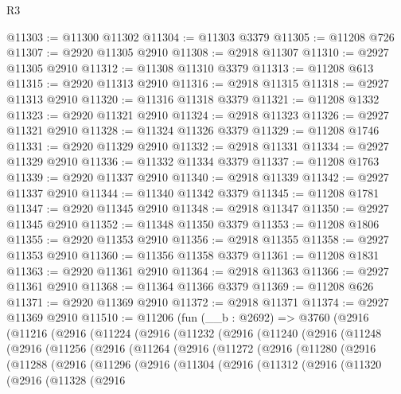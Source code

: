\begin{lexlean}{R3}
\begin{coremodule}
@11303 := @11300 @11302
@11304 := @11303 @3379
@11305 := @11208 @726
@11307 := @2920 @11305 @2910
@11308 := @2918 @11307
@11310 := @2927 @11305 @2910
@11312 := @11308 @11310 @3379
@11313 := @11208 @613
@11315 := @2920 @11313 @2910
@11316 := @2918 @11315
@11318 := @2927 @11313 @2910
@11320 := @11316 @11318 @3379
@11321 := @11208 @1332
@11323 := @2920 @11321 @2910
@11324 := @2918 @11323
@11326 := @2927 @11321 @2910
@11328 := @11324 @11326 @3379
@11329 := @11208 @1746
@11331 := @2920 @11329 @2910
@11332 := @2918 @11331
@11334 := @2927 @11329 @2910
@11336 := @11332 @11334 @3379
@11337 := @11208 @1763
@11339 := @2920 @11337 @2910
@11340 := @2918 @11339
@11342 := @2927 @11337 @2910
@11344 := @11340 @11342 @3379
@11345 := @11208 @1781
@11347 := @2920 @11345 @2910
@11348 := @2918 @11347
@11350 := @2927 @11345 @2910
@11352 := @11348 @11350 @3379
@11353 := @11208 @1806
@11355 := @2920 @11353 @2910
@11356 := @2918 @11355
@11358 := @2927 @11353 @2910
@11360 := @11356 @11358 @3379
@11361 := @11208 @1831
@11363 := @2920 @11361 @2910
@11364 := @2918 @11363
@11366 := @2927 @11361 @2910
@11368 := @11364 @11366 @3379
@11369 := @11208 @626
@11371 := @2920 @11369 @2910
@11372 := @2918 @11371
@11374 := @2927 @11369 @2910
@11510 := @11206
    (fun (__b : @2692) =>
    @3760
      (@2916
        (@11216
          (@2916
            (@11224
              (@2916
                (@11232
                  (@2916
                    (@11240
                      (@2916
                        (@11248
                          (@2916
                            (@11256
                              (@2916
                                (@11264
                                  (@2916
                                    (@11272
                                      (@2916
                                        (@11280
                                          (@2916
                                            (@11288
                                              (@2916
                                                (@11296
                                                  (@2916
                                                    (@11304
                                                      (@2916
                                                        (@11312
                                                          (@2916
                                                            (@11320
                                                              (@2916
                                                                (@11328
                                                                  (@2916

\end{coremodule}
\end{lexlean}
